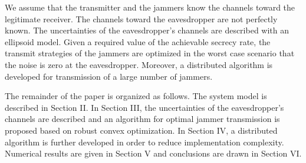 \documentclass[12pt, journal,onecolumn,draftclsnofoot]{IEEEtran}
\begin{document}
We assume that the transmitter and the jammers know the channels toward the legitimate receiver.  The channels toward the eavesdropper are not perfectly known.  The uncertainties of the eavesdropper's channels are described with an ellipsoid model.   Given a required value of the achievable secrecy rate, the transmit strategies of the jammers are optimized in the worst case scenario that the noise is zero at the eavesdropper.  Moreover, a distributed algorithm is developed for transmission of a large number of jammers. 

The remainder of the paper is organized as follows.  The system model is described in Section II.  In Section III, the uncertainties of the eavesdropper's channels are described and an algorithm for optimal jammer transmission is proposed based on robust convex optimization.  In Section IV, a distributed algorithm is further developed in order to reduce implementation complexity.  Numerical results are given in Section V and conclusions are drawn in Section VI.
\end{document}
